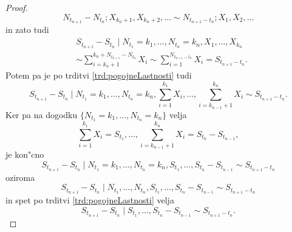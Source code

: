 \documentclass[12pt, a4paper, reqno]{amsart}
\theoremstyle{definition}
\newtheorem{opomba}[definicija]{Opomba}
\theoremstyle{plain}
\newcommand{\N}{\mathbb{N}}
\newcommand{\1}{\mathds{1}}
\newcommand*{\refPriloga}[1]{%
  \begingroup
    \hypersetup{
      linkcolor=red,
      linkbordercolor=red,
    }%
    \ref{#1}%
  \endgroup
}
\begin{document}
\begin{proof}
            \begin{equation*}
                N_{t_{n+1}} - N_{t_n}; X_{k_n + 1}, X_{k_n + 2}, \dots \sim N_{t_{n+1} - t_n}; X_1, X_2, \dots
            \end{equation*}
            in zato tudi 
            \begin{align*}
                &S_{t_{n+1}} - S_{t_n} \mid N_{t_1} = k_1, \dots, N_{t_n} = k_n, X_1, \dots, X_{k_n} \\
                &\sim \sum_{i = k_n + 1}^{k_n + N_{t_{n+1}} - N_{t_n}}X_i 
                \sim \sum_{i = 1}^{N_{t_{n+1} - t_n}}X_i = S_{t_{n+1} - t_n}.
            \end{align*}
            Potem pa je po trditvi \refPriloga{trd:pogojneLastnosti} tudi
            \begin{equation*}
                S_{t_{n+1}} - S_{t_n}\mid N_{t_1} = k_1, \dots, N_{t_n} = k_n, \sum_{i=1}^{k_1}X_i, \dots, \sum_{i=k_{n-1} + 1}^{k_n}X_i \sim S_{t_{n+1} - t_n}.
            \end{equation*}
            Ker pa na dogodku $\{N_{t_1} = k_1, \dots, N_{t_n} = k_n\}$ velja 
            \begin{equation*}
                \sum_{i=1}^{k_1}X_i = S_{t_1}, \dots, \sum_{i=k_{n-1} + 1}^{k_n}X_i = S_{t_n} - S_{t_{n-1}},
            \end{equation*}
            je kon"cno 
            \begin{equation*}
                S_{t_{n+1}} - S_{t_n}\mid N_{t_1} = k_1, \dots, N_{t_n} = k_n, S_{t_1}, \dots, S_{t_n} - S_{t_{n-1}} \sim S_{t_{n+1} - t_n}
            \end{equation*}
            oziroma 
            \begin{equation*}
                S_{t_{n+1}} - S_{t_n}\mid N_{t_1}, \dots, N_{t_n}, S_{t_1}, \dots, S_{t_n} - S_{t_{n-1}} \sim S_{t_{n+1} - t_n}
            \end{equation*}
            in spet po trditvi \refPriloga{trd:pogojneLastnosti} velja
            \begin{equation*}
                S_{t_{n+1}} - S_{t_n}\mid S_{t_1}, \dots, S_{t_n} - S_{t_{n-1}} \sim S_{t_{n+1} - t_n}.
            \end{equation*}
        \end{proof}

\end{document}
